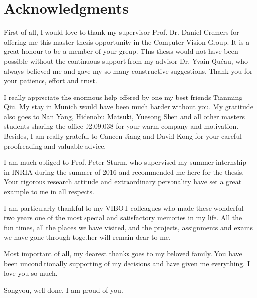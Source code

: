 \doublespacing

\setcounter{page}{1} \pagestyle{plain}


\tableofcontents

\listoffigures
\listoftables

\chapter*{Acknowledgments}
         {\protect{}}

First of all, I would love to thank my supervisor Prof. Dr. Daniel Cremers for offering me this master thesis opportunity in the Computer Vision Group. 
It is a great honour to be a member of your group. 
This thesis would not have been possible without the continuous support from my advisor Dr. Yvain Qu\'{e}au, who always believed me and gave my so many constructive suggestions. 
Thank you for your patience, effort and trust.

I really appreciate the enormous help offered by one my best friends Tianming Qiu.
My stay in Munich would have been much harder without you.
My gratitude also goes to Nan Yang, Hidenobu Matsuki, Yuesong Shen and all other masters students sharing the office 02.09.038 for your warm company and motivation. 
Besides, I am really grateful to Cancen Jiang and David Kong for your careful proofreading and valuable advice.

I am much obliged to Prof. Peter Sturm, who supervised my summer internship in INRIA during the summer of 2016 and recommended me here for the thesis.
Your rigorous research attitude and extraordinary personality have set a great example to me in all respects.

I am particularly thankful to my VIBOT colleagues who made these wonderful two years one of the most special and satisfactory memories in my life.
All the fun times, all the places we have visited, and the projects, assignments and exams we have gone through together will remain dear to me.

Most important of all, my dearest thanks goes to my beloved family.
You have been unconditionally supporting of my decisions and have given me everything. I love you so much.

Songyou, well done, I am proud of you.

\pagestyle{fancy}
